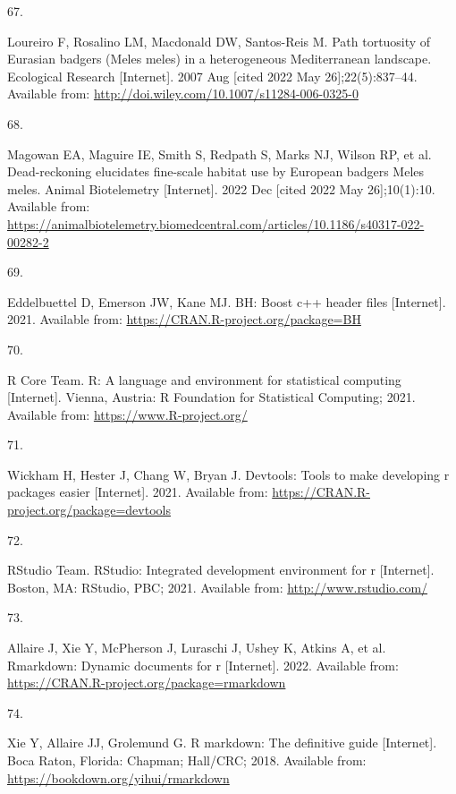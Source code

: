 \documentclass[10pt,a4paper]{article}
\newlength{\cslhangindent}
\newlength{\csllabelwidth}
\newenvironment{CSLReferences}[2] %
{\begin{list}{}{%
	\setlength{\itemindent}{0pt}
	\setlength{\leftmargin}{0pt}
	\setlength{\parsep}{0pt}
	\ifodd #1
	\setlength{\leftmargin}{\cslhangindent}
	\setlength{\itemindent}{-1\cslhangindent}
	\fi
	\setlength{\itemsep}{#2\baselineskip}}}
{\end{list}}
\newcommand{\CSLLeftMargin}[1]{\parbox[t]{\csllabelwidth}{\strut#1\strut}}
\newcommand{\CSLRightInline}[1]{\parbox[t]{\linewidth - \csllabelwidth}{\strut#1\strut}}
\begin{document}
\begin{CSLReferences}{0}{1}
\CSLLeftMargin{67. }%
\CSLRightInline{Loureiro F, Rosalino LM, Macdonald DW, Santos-Reis M. Path tortuosity of {Eurasian} badgers ({Meles} meles) in a heterogeneous {Mediterranean} landscape. Ecological Research {[}Internet{]}. 2007 Aug {[}cited 2022 May 26{]};22(5):837--44. Available from: \url{http://doi.wiley.com/10.1007/s11284-006-0325-0}}

\CSLLeftMargin{68. }%
\CSLRightInline{Magowan EA, Maguire IE, Smith S, Redpath S, Marks NJ, Wilson RP, et al. Dead-reckoning elucidates fine-scale habitat use by {European} badgers {Meles} meles. Animal Biotelemetry {[}Internet{]}. 2022 Dec {[}cited 2022 May 26{]};10(1):10. Available from: \url{https://animalbiotelemetry.biomedcentral.com/articles/10.1186/s40317-022-00282-2}}

\CSLLeftMargin{69. }%
\CSLRightInline{Eddelbuettel D, Emerson JW, Kane MJ. BH: Boost c++ header files {[}Internet{]}. 2021. Available from: \url{https://CRAN.R-project.org/package=BH}}

\CSLLeftMargin{70. }%
\CSLRightInline{R Core Team. R: A language and environment for statistical computing {[}Internet{]}. Vienna, Austria: R Foundation for Statistical Computing; 2021. Available from: \url{https://www.R-project.org/}}

\CSLLeftMargin{71. }%
\CSLRightInline{Wickham H, Hester J, Chang W, Bryan J. Devtools: Tools to make developing r packages easier {[}Internet{]}. 2021. Available from: \url{https://CRAN.R-project.org/package=devtools}}

\CSLLeftMargin{72. }%
\CSLRightInline{RStudio Team. RStudio: Integrated development environment for r {[}Internet{]}. Boston, MA: RStudio, PBC; 2021. Available from: \url{http://www.rstudio.com/}}

\CSLLeftMargin{73. }%
\CSLRightInline{Allaire J, Xie Y, McPherson J, Luraschi J, Ushey K, Atkins A, et al. Rmarkdown: Dynamic documents for r {[}Internet{]}. 2022. Available from: \url{https://CRAN.R-project.org/package=rmarkdown}}

\CSLLeftMargin{74. }%
\CSLRightInline{Xie Y, Allaire JJ, Grolemund G. R markdown: The definitive guide {[}Internet{]}. Boca Raton, Florida: Chapman; Hall/CRC; 2018. Available from: \url{https://bookdown.org/yihui/rmarkdown}}


\end{CSLReferences}
\end{document}
